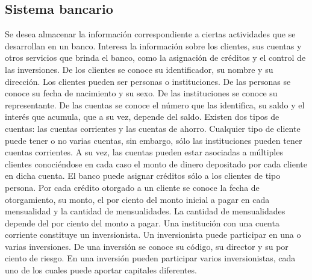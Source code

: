\subsection{Sistema bancario}
Se desea almacenar la informaci\'on correspondiente a ciertas actividades que se desarrollan en un banco. Interesa la informaci\'on sobre los clientes, sus cuentas y otros servicios que brinda el banco, como la asignaci\'on de cr\'editos y el control de las inversiones. De los clientes se conoce su identificador, su nombre y su direcci\'on. Los clientes pueden ser personas o instituciones. De las personas se conoce su fecha de nacimiento y su sexo. De las instituciones se conoce su representante. De las cuentas se conoce el n\'umero que las identifica, su saldo y el inter\'es que acumula, que a su vez, depende del saldo. Existen dos tipos de cuentas: las cuentas corrientes y las cuentas de ahorro. Cualquier tipo de cliente puede tener o no varias cuentas, sin embargo, s\'olo las instituciones pueden tener cuentas corrientes. A su vez, las cuentas pueden estar asociadas a m\'ultiples clientes conoci\'endose en cada caso el monto de dinero depositado por cada cliente en dicha cuenta. El banco puede asignar cr\'editos s\'olo a los clientes de tipo persona. Por cada cr\'edito otorgado a un cliente se conoce la fecha de otorgamiento, su monto, el por ciento del monto inicial a pagar en cada mensualidad y la cantidad de mensualidades. La cantidad de mensualidades depende del por ciento del monto a pagar. Una instituci\'on con una cuenta corriente constituye un inversionista. Un inversionista puede participar en una o varias inversiones. De una inversi\'on se conoce su c\'odigo, su director y su por ciento de riesgo. En una inversi\'on pueden participar varios inversionistas, cada uno de los cuales puede aportar capitales diferentes.

